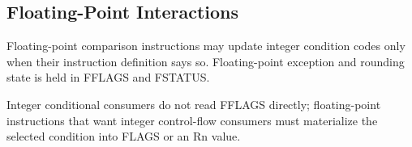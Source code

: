 \subsection{Floating-Point Interactions}
Floating-point comparison instructions may update integer condition codes only when their instruction definition says
so. Floating-point exception and rounding state is held in FFLAGS and FSTATUS.

Integer conditional consumers do not read FFLAGS directly; floating-point instructions that want integer control-flow
consumers must materialize the selected condition into FLAGS or an Rn value.
